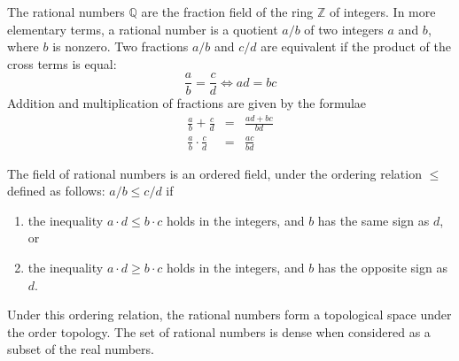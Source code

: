 \documentclass[12pt]{article}
\begin{document}
The rational numbers $\mathbb{Q}$ are the fraction field of the ring $\mathbb{Z}$ of integers. In more elementary terms, a rational number is a quotient $a/b$ of two integers $a$ and $b$, where $b$ is nonzero. Two fractions $a/b$ and $c/d$ are equivalent if the product of the cross terms is equal:
$$
\frac{a}{b} = \frac{c}{d} \iff ad = bc
$$
Addition and multiplication of fractions are given by the formulae
\begin{eqnarray*}
\frac{a}{b} + \frac{c}{d} & = & \frac{ad + bc}{bd} \\
\frac{a}{b} \cdot \frac{c}{d} & = & \frac{ac}{bd}
\end{eqnarray*}

The field of rational numbers is an ordered field, under the ordering relation $\leq$ defined as follows: $a/b \leq c/d$ if
\begin{enumerate}
\item the inequality $a\cdot d \leq b \cdot c$ holds in the integers, and $b$ has the same sign as $d$, or
\item the inequality $a\cdot d \geq b \cdot c$ holds in the integers, and $b$ has the opposite sign as $d$.
\end{enumerate}
Under this ordering relation, the rational numbers form a topological space under the order topology. The set of rational numbers is dense when considered as a subset of the real numbers.
\end{document}

